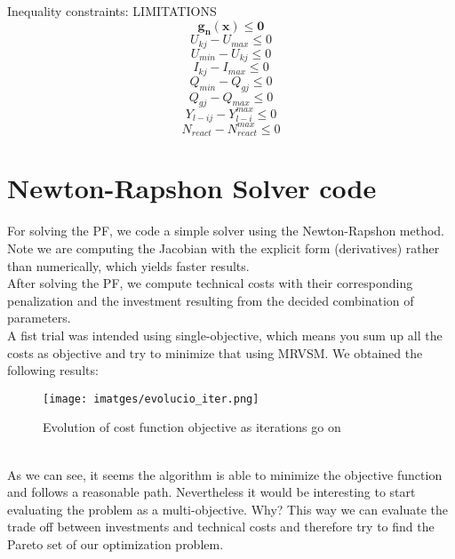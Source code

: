 \documentclass{article}
\begin{document}
Inequality constraints: LIMITATIONS
\\
\[\mathbf{g_n(x)\leq0}\]
\[U_{kj}-U_{max}\leq0\]
\[U_{min}-U_{kj}\leq0\]
\[I_{kj}-I_{max}\leq0\]
\[Q_{min}-Q_{gj}\leq0\]
\[Q_{gj}-Q_{max}\leq0\]
\[Y_{l-ij}-Y_{l-i}^{max}\leq0\]
\[N_{react}-N_{react}^{max}\leq0\]

\newpage
\section{Newton-Rapshon Solver code
}
For solving the PF, we code a simple solver using the Newton-Rapshon method. Note we are computing the Jacobian with the explicit form (derivatives) rather than numerically, which yields faster results.\\
After solving the PF, we compute technical costs with their corresponding penalization and the investment resulting from the decided combination of parameters.\\
A fist trial was intended using single-objective, which means you sum up all the costs as objective and try to minimize that using MRVSM. We obtained the following results:
\begin{figure}[h] %
    \centering
	\texttt{[image: imatges/evolucio\_iter.png]}
	\caption{Evolution of cost function objective as iterations go on}
	\label{fig:binhkorn} %
\end{figure}\\

As we can see, it seems the algorithm is able to minimize the objective function and follows a reasonable path. Nevertheless it would be interesting to start evaluating the problem as a multi-objective. Why? This way we can evaluate the trade off between investments and technical costs and therefore try to find the Pareto set of our optimization problem.\\
\end{document}
